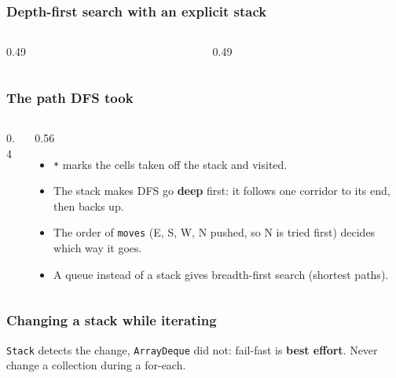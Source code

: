 \documentclass[aspectratio=169,10pt,compress]{beamer}
\begin{document}
\begin{frame}[t,fragile] \frametitle{Depth-first search with an explicit stack}
  \begin{columns}[T]
    \begin{column}{0.49\textwidth}
    \end{column}
    \begin{column}{0.49\textwidth}
    \end{column}
  \end{columns}
\end{frame}




\begin{frame}[t,fragile] \frametitle{The path DFS took}
  \begin{columns}[T]
    \begin{column}{0.4\textwidth}
    \end{column}
    \begin{column}{0.56\textwidth}
      \begin{itemize}\small
        \item \texttt{*} marks the cells taken off the stack and visited.
        \item The stack makes DFS go \textbf{deep} first: it follows one corridor to its end, then backs up.
        \item The order of \texttt{moves} (E, S, W, N pushed, so N is tried first) decides which way it goes.
        \item A queue instead of a stack gives breadth-first search (shortest paths).
      \end{itemize}
    \end{column}
  \end{columns}
\end{frame}





\begin{frame}[t,fragile] \frametitle{Changing a stack while iterating}

  \vspace{0.2em}
  \small \texttt{Stack} detects the change, \texttt{ArrayDeque} did not: fail-fast is \textbf{best effort}. Never change a collection during a for-each.
\end{frame}
\end{document}
